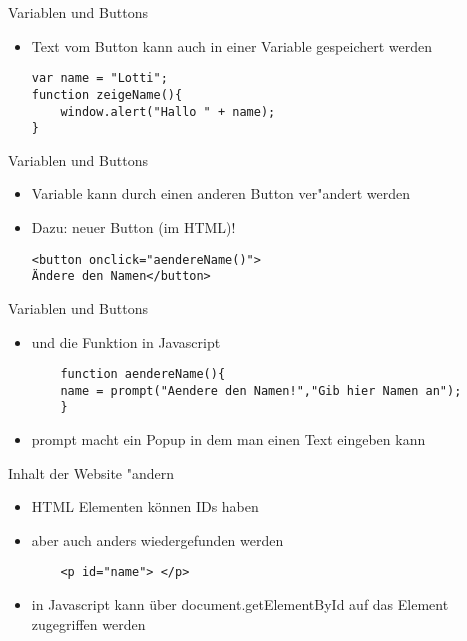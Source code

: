 \documentclass[18pt]{beamer}
\begin{document}
\begin{frame}[fragile]{Variablen und Buttons}
\begin{itemize}
\item Text vom Button kann auch in einer Variable gespeichert werden
\begin{lstlisting}
var name = "Lotti";
function zeigeName(){
	window.alert("Hallo " + name);
}
\end{lstlisting}
\end{itemize}
\end{frame}


\begin{frame}[fragile]{Variablen und Buttons}
\begin{itemize}
\item Variable kann durch einen anderen Button ver"andert werden
\item Dazu: neuer Button (im HTML)!
\begin{lstlisting}
<button onclick="aendereName()">
Ändere den Namen</button>
\end{lstlisting}
\end{itemize}
\end{frame}


\begin{frame}[fragile]{Variablen und Buttons}
\begin{itemize}
	\item und die Funktion in Javascript 
	\begin{lstlisting}
	function aendereName(){
	name = prompt("Aendere den Namen!","Gib hier Namen an");
	}
	\end{lstlisting}
	\item prompt macht ein Popup in dem man einen Text eingeben kann
\end{itemize}
\end{frame}

\begin{frame}[fragile]{Inhalt der Website "andern}
\begin{itemize}
\item HTML Elementen können IDs haben
\item aber auch anders wiedergefunden werden
\begin{lstlisting}
	<p id="name"> </p>
\end{lstlisting}
\item in Javascript kann über document.getElementById auf das Element zugegriffen werden
\end{itemize}
\end{frame}
\end{document}
